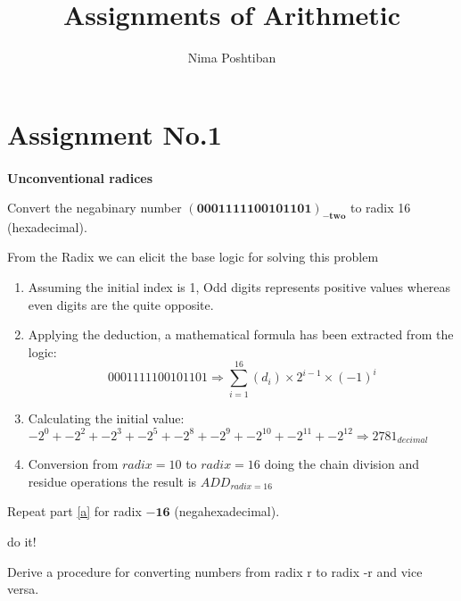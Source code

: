 \documentclass[16pt,answers]{exam}
\author{Nima Poshtiban}
\title{Assignments of Arithmetic}
\date{\displaydate{date}}
\begin{document}
	\maketitle
	\tableofcontents
	\pagebreak
	\section{Assignment No.1}
\paragraph{}
\textbf{Unconventional radices}
\begin{questions}
\question Convert the negabinary number $\mathbf{(0001 1111 0010 1101)_{-two}}$ to radix 16
	(hexadecimal).\label{a}
	\begin{solution}[space]
		From the Radix we can elicit the base logic for solving this problem\newline
		\begin{enumerate}
			\item Assuming the initial index is 1, Odd digits represents positive values whereas even digits are the quite opposite.
			\item Applying the deduction, a mathematical formula has been extracted from the logic:
			\[
			  0001 1111 0010 1101 \Longrightarrow \sum_{i=1}^{16}{(d_{i})\times2^{i-1}\times(-1)^{i} }
			\]
			\item Calculating the initial value:
			\(-2^{0} + -2^{2} + -2^{3} + -2^{5}  + - 2^{8}  + -2^{9} + -2^{10} + -2^{11} + -2^{12} \Longrightarrow 2781_{decimal}\)
			\item Conversion from \(radix=10\) to \(radix=16\)
			doing the chain division and residue operations the result is \( ADD_{radix=16} \)
		\end{enumerate}
	\end{solution}
\question Repeat part \ref{a} for radix $\mathbf{-16}$ (negahexadecimal).
	\begin{solution}[space]
	do it!
\end{solution}
\question Derive a procedure for converting numbers from radix r to radix -r and vice
versa.
\end{questions}
\end{document}
